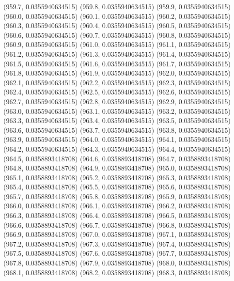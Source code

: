 {					(959.7, 0.0355940634515)
					(959.8, 0.0355940634515)
					(959.9, 0.0355940634515)
					(960.0, 0.0355940634515)
					(960.1, 0.0355940634515)
					(960.2, 0.0355940634515)
					(960.3, 0.0355940634515)
					(960.4, 0.0355940634515)
					(960.5, 0.0355940634515)
					(960.6, 0.0355940634515)
					(960.7, 0.0355940634515)
					(960.8, 0.0355940634515)
					(960.9, 0.0355940634515)
					(961.0, 0.0355940634515)
					(961.1, 0.0355940634515)
					(961.2, 0.0355940634515)
					(961.3, 0.0355940634515)
					(961.4, 0.0355940634515)
					(961.5, 0.0355940634515)
					(961.6, 0.0355940634515)
					(961.7, 0.0355940634515)
					(961.8, 0.0355940634515)
					(961.9, 0.0355940634515)
					(962.0, 0.0355940634515)
					(962.1, 0.0355940634515)
					(962.2, 0.0355940634515)
					(962.3, 0.0355940634515)
					(962.4, 0.0355940634515)
					(962.5, 0.0355940634515)
					(962.6, 0.0355940634515)
					(962.7, 0.0355940634515)
					(962.8, 0.0355940634515)
					(962.9, 0.0355940634515)
					(963.0, 0.0355940634515)
					(963.1, 0.0355940634515)
					(963.2, 0.0355940634515)
					(963.3, 0.0355940634515)
					(963.4, 0.0355940634515)
					(963.5, 0.0355940634515)
					(963.6, 0.0355940634515)
					(963.7, 0.0355940634515)
					(963.8, 0.0355940634515)
					(963.9, 0.0355940634515)
					(964.0, 0.0355940634515)
					(964.1, 0.0355940634515)
					(964.2, 0.0355940634515)
					(964.3, 0.0355940634515)
					(964.4, 0.0355940634515)
					(964.5, 0.0358893418708)
					(964.6, 0.0358893418708)
					(964.7, 0.0358893418708)
					(964.8, 0.0358893418708)
					(964.9, 0.0358893418708)
					(965.0, 0.0358893418708)
					(965.1, 0.0358893418708)
					(965.2, 0.0358893418708)
					(965.3, 0.0358893418708)
					(965.4, 0.0358893418708)
					(965.5, 0.0358893418708)
					(965.6, 0.0358893418708)
					(965.7, 0.0358893418708)
					(965.8, 0.0358893418708)
					(965.9, 0.0358893418708)
					(966.0, 0.0358893418708)
					(966.1, 0.0358893418708)
					(966.2, 0.0358893418708)
					(966.3, 0.0358893418708)
					(966.4, 0.0358893418708)
					(966.5, 0.0358893418708)
					(966.6, 0.0358893418708)
					(966.7, 0.0358893418708)
					(966.8, 0.0358893418708)
					(966.9, 0.0358893418708)
					(967.0, 0.0358893418708)
					(967.1, 0.0358893418708)
					(967.2, 0.0358893418708)
					(967.3, 0.0358893418708)
					(967.4, 0.0358893418708)
					(967.5, 0.0358893418708)
					(967.6, 0.0358893418708)
					(967.7, 0.0358893418708)
					(967.8, 0.0358893418708)
					(967.9, 0.0358893418708)
					(968.0, 0.0358893418708)
					(968.1, 0.0358893418708)
					(968.2, 0.0358893418708)
					(968.3, 0.0358893418708)
}
